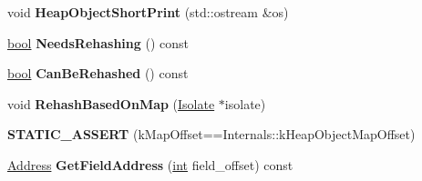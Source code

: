 \begin{DoxyCompactItemize}
void {\bfseries Heap\+Object\+Short\+Print} (std\+::ostream \&os)
\item 
\mbox{\label{classv8_1_1internal_1_1HeapObject_a9ae76fbc06f0e9c94ae60dde295d5aea}} 
\mbox{\hyperlink{classbool}{bool}} {\bfseries Needs\+Rehashing} () const
\item 
\mbox{\label{classv8_1_1internal_1_1HeapObject_a1d97746037353238e906dc46e24a19d0}} 
\mbox{\hyperlink{classbool}{bool}} {\bfseries Can\+Be\+Rehashed} () const
\item 
\mbox{\label{classv8_1_1internal_1_1HeapObject_ab4109907600cc6769526cca4b63f0228}} 
void {\bfseries Rehash\+Based\+On\+Map} (\mbox{\hyperlink{classv8_1_1internal_1_1Isolate}{Isolate}} $\ast$isolate)
\item 
\mbox{\label{classv8_1_1internal_1_1HeapObject_a1131daa4da3892fce29f1292aabafab3}} 
{\bfseries S\+T\+A\+T\+I\+C\+\_\+\+A\+S\+S\+E\+RT} (k\+Map\+Offset==Internals\+::k\+Heap\+Object\+Map\+Offset)
\item 
\mbox{\label{classv8_1_1internal_1_1HeapObject_aaa730555783e7ac8c86a2da00ff8156d}} 
\mbox{\hyperlink{classuintptr__t}{Address}} {\bfseries Get\+Field\+Address} (\mbox{\hyperlink{classint}{int}} field\+\_\+offset) const
\end{DoxyCompactItemize}
